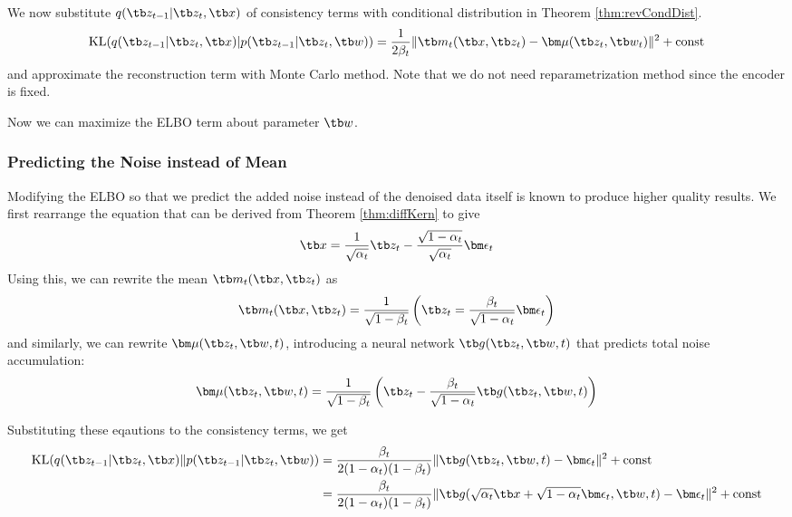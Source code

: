 \documentclass{article}
\begin{document}
            We now substitute $q(\tb z_{t-1}|\tb z_t,\tb x)$ of consistency terms with conditional distribution in Theorem \ref{thm:revCondDist}.
            \[
            \text{KL}(q(\tb z_{t-1}|\tb z_t,\tb x)|p(\tb z_{t-1}|\tb z_t,\tb w)) = \frac{1}{2\beta_t}\|\tb m_t(\tb x,\tb z_t)-\bm\mu(\tb z_t,\tb w_t)\|^2 + \text{const}
            \]
            and approximate the reconstruction term with Monte Carlo method. Note that we do not need reparametrization method since the encoder is fixed.

            Now we can maximize the ELBO term about parameter $\tb w$.

        \subsubsection{Predicting the Noise instead of Mean}
            Modifying the ELBO so that we predict the added noise instead of the denoised data itself is known to produce higher quality results.
            We first rearrange the equation that can be derived from Theorem \ref{thm:diffKern} to give
            \[
            \tb x = \frac{1}{\sqrt{\alpha_t}}\tb z_t - \frac{\sqrt{1-\alpha_t}}{\sqrt{\alpha_t}}\bm\epsilon_t
            \]
            Using this, we can rewrite the mean $\tb m_t(\tb x,\tb z_t)$ as
            \[
            \tb m_t(\tb x,\tb z_t)=\frac{1}{\sqrt{1-\beta_t}}\left( \tb z_t = \frac{\beta_t}{\sqrt{1-\alpha_t}}\bm\epsilon_t \right)
            \]
            and similarly, we can rewrite $\bm\mu(\tb z_t, \tb w, t)$, introducing a neural network $\tb g(\tb z_t, \tb w, t)$ that predicts 
            total noise accumulation:
            \[
            \bm\mu(\tb z_t, \tb w, t)=\frac{1}{\sqrt{1-\beta_t}}\left( \tb z_t - \frac{\beta_t}{\sqrt{1-\alpha_t}}\tb g(\tb z_t, \tb w, t) \right)
            \]

            Substituting these eqautions to the consistency terms, we get
            \begin{align*}
                \text{KL}(q(\tb z_{t-1}|\tb z_t,\tb x)\|p(\tb z_{t-1}|\tb z_t,\tb w))
                &=\frac{\beta_t}{2(1-\alpha_t)(1-\beta_t)}\|\tb g(\tb z_t, \tb w, t)-\bm\epsilon_t\|^2 + \text{const}
            \\  &=\frac{\beta_t}{2(1-\alpha_t)(1-\beta_t)}\|\tb g(\sqrt{\alpha_t}\tb x + \sqrt{1-\alpha_t}\bm\epsilon_t, \tb w, t)-\bm\epsilon_t\|^2 + \text{const}
            \end{align*}
\end{document}
